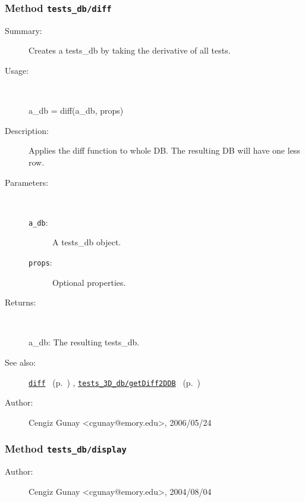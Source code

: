 \subsubsection[Method \texttt{diff}]{Method \texttt{tests\_db/diff}}%
%
\label{ref_tests_db__diff}%
\hypertarget{ref_tests_db__diff}{}%
\begin{description}
\item[Summary:]Creates a tests\_db by taking the derivative of all tests.
%
\item[Usage:]~%
\begin{lyxcode}%
a\_db = diff(a\_db, props)
%
\end{lyxcode}%
%
\item[Description:]%
Applies the diff function to whole DB. The resulting DB will have one less row.
\item[Parameters:]~
\begin{description}%
\item[\texttt{a\_db}:]
 A tests\_db object.
\item[\texttt{props}:]
 Optional properties.
\end{description}%
%
\item[Returns:
]~

	a\_db: The resulting tests\_db.
%
%
\item[See also:]%
\hyperlink{ref_diff}{\texttt{diff}}%
\ (p.~\pageref{ref_diff})%
%
, \hyperlink{ref_tests_3D_db__getDiff2DDB}{\texttt{tests\_3D\_db/getDiff2DDB}}%
\ (p.~\pageref{ref_tests_3D_db__getDiff2DDB})%
%
%
\item[Author:]%
Cengiz Gunay <cgunay@emory.edu>, 2006/05/24
%
\end{description}
\methodline%
\subsubsection[Method \texttt{display}]{Method \texttt{tests\_db/display}}%
%
\label{ref_tests_db__display}%
\hypertarget{ref_tests_db__display}{}%
\begin{description}
%
%
%
%
%
%
%
\item[Author:]%
Cengiz Gunay <cgunay@emory.edu>, 2004/08/04
%
\end{description}
\methodline%

